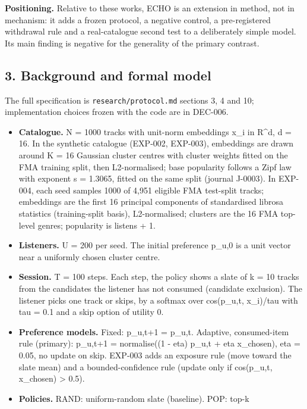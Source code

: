 \documentclass[
]{article}
\providecommand{\tightlist}{%
  \setlength{\itemsep}{0pt}\setlength{\parskip}{0pt}}
\begin{document}
\textbf{Positioning.} Relative to these works, ECHO is an extension in
method, not in mechanism: it adds a frozen protocol, a negative control,
a pre-registered withdrawal rule and a real-catalogue second test to a
deliberately simple model. Its main finding is negative for the
generality of the primary contrast.

\subsection{3. Background and formal
model}\label{background-and-formal-model}

The full specification is \texttt{research/protocol.md} sections 3, 4
and 10; implementation choices frozen with the code are in DEC-006.

\begin{itemize}
\tightlist
\item
  \textbf{Catalogue.} N = 1000 tracks with unit-norm embeddings x\_i in
  R\^{}d, d = 16. In the synthetic catalogue (EXP-002, EXP-003),
  embeddings are drawn around K = 16 Gaussian cluster centres with
  cluster weights fitted on the FMA training split, then L2-normalised;
  base popularity follows a Zipf law with exponent s = 1.3065, fitted on
  the same split (journal J-0003). In EXP-004, each seed samples 1000 of
  4,951 eligible FMA test-split tracks; embeddings are the first 16
  principal components of standardised librosa statistics
  (training-split basis), L2-normalised; clusters are the 16 FMA
  top-level genres; popularity is listens + 1.
\item
  \textbf{Listeners.} U = 200 per seed. The initial preference p\_u,0 is
  a unit vector near a uniformly chosen cluster centre.
\item
  \textbf{Session.} T = 100 steps. Each step, the policy shows a slate
  of k = 10 tracks from the candidates the listener has not consumed
  (candidate exclusion). The listener picks one track or skips, by a
  softmax over cos(p\_u,t, x\_i)/tau with tau = 0.1 and a skip option of
  utility 0.
\item
  \textbf{Preference models.} Fixed: p\_u,t+1 = p\_u,t. Adaptive,
  consumed-item rule (primary): p\_u,t+1 = normalise((1 - eta) p\_u,t +
  eta x\_chosen), eta = 0.05, no update on skip. EXP-003 adds an
  exposure rule (move toward the slate mean) and a bounded-confidence
  rule (update only if cos(p\_u,t, x\_chosen) \textgreater{} 0.5).
\item
  \textbf{Policies.} RAND: uniform-random slate (baseline). POP: top-k

\end{itemize}
\end{document}
